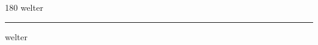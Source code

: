 
\begin{frame}
\begin{center}
\begin{turn}{180}
{\fontsize{2.5cm}{1em}\selectfont welter}
\end{turn}
\vspace{1em}\par  
\hrule
\vspace{1em}\par  
{\fontsize{2.5cm}{1em}\selectfont welter}
\end{center}
\end{frame}
